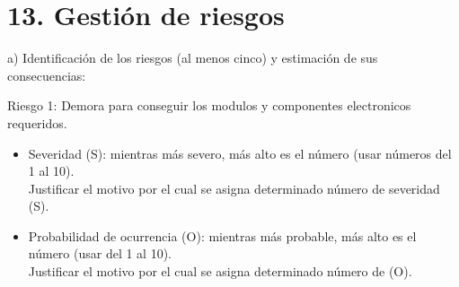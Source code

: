 \documentclass[
11pt, %
codirector, %
]{charter}
\begin{document}
\section{13. Gestión de riesgos}
\label{sec:riesgos}
a) Identificación de los riesgos (al menos cinco) y estimación de sus consecuencias:

Riesgo 1: Demora para conseguir los modulos y componentes electronicos requeridos.
\begin{itemize}
	\item Severidad (S): mientras más severo, más alto es el número (usar números del 1 al 10).\\
	Justificar el motivo por el cual se asigna determinado número de severidad (S).
	\item Probabilidad de ocurrencia (O): mientras más probable, más alto es el número (usar del 1 al 10).\\
	Justificar el motivo por el cual se asigna determinado número de (O). 
\end{itemize}  
\end{document}
